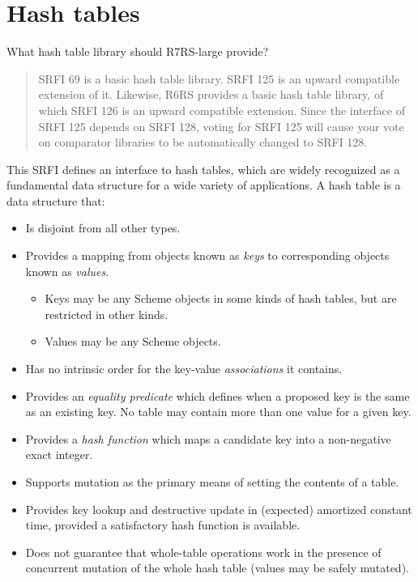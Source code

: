 \section{Hash tables}
 What hash table library should R7RS-large provide?

\begin{quote}
SRFI 69 is a basic hash table library. SRFI 125 is an upward compatible
extension of it. Likewise, R6RS provides a basic hash table library, of
which SRFI 126 is an upward compatible extension. Since the interface of
SRFI 125 depends on SRFI 128, voting for SRFI 125 will cause your vote
on comparator libraries to be automatically changed to SRFI 128.
\end{quote}



This SRFI defines an interface to hash tables, which are widely
recognized as a fundamental data structure for a wide variety of
applications. A hash table is a data structure that:

\begin{itemize}
\tightlist
\item
  Is disjoint from all other types.
\item
  Provides a mapping from objects known as \emph{keys} to corresponding
  objects known as \emph{values}.

  \begin{itemize}
  \tightlist
  \item
    Keys may be any Scheme objects in some kinds of hash tables, but are
    restricted in other kinds.
  \item
    Values may be any Scheme objects.
  \end{itemize}
\item
  Has no intrinsic order for the key-value \emph{associations} it
  contains.
\item
  Provides an \emph{equality predicate} which defines when a proposed
  key is the same as an existing key. No table may contain more than one
  value for a given key.
\item
  Provides a \emph{hash function} which maps a candidate key into a
  non-negative exact integer.
\item
  Supports mutation as the primary means of setting the contents of a
  table.
\item
  Provides key lookup and destructive update in (expected) amortized
  constant time, provided a satisfactory hash function is available.
\item
  Does not guarantee that whole-table operations work in the presence of
  concurrent mutation of the whole hash table (values may be safely
  mutated).
\end{itemize}

